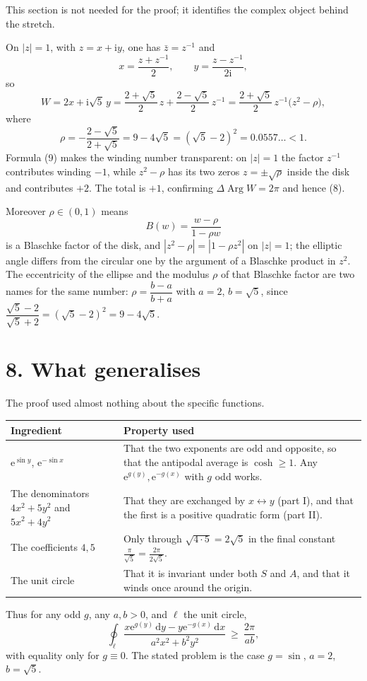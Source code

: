 \documentclass[12pt]{article}
\newcommand{\dd}{\,\mathrm{d}}
\newcommand{\ii}{\mathrm{i}}
\newcommand{\e}{\mathrm{e}}
\newcommand{\Arg}{\operatorname{Arg}}
\newcommand{\lc}{\ell}
\begin{document}
This section is not needed for the proof; it identifies the complex
object behind the stretch.

On \(|z|=1\), with \(z=x+\ii y\), one has \(\bar z=z^{-1}\) and
\[
x=\frac{z+z^{-1}}{2},\qquad y=\frac{z-z^{-1}}{2\ii},
\]
so
\[
W=2x+\ii\sqrt5\,y=\frac{2+\sqrt5}{2}\,z+\frac{2-\sqrt5}{2}\,z^{-1}
=\frac{2+\sqrt5}{2}\,z^{-1}\bigl(z^2-\rho\bigr),
\tag{9}
\]
where
\[
\rho=-\frac{2-\sqrt5}{2+\sqrt5}=9-4\sqrt5=(\sqrt5-2)^2=0.0557\ldots<1 .
\]
Formula (9) makes the winding number transparent: on \(|z|=1\) the factor
\(z^{-1}\) contributes winding \(-1\), while \(z^2-\rho\) has its two
zeros \(z=\pm\sqrt\rho\) inside the disk and contributes \(+2\). The
total is \(+1\), confirming \(\Delta\Arg W=2\pi\) and hence (8).

Moreover \(\rho\in(0,1)\) means
\[
B(w)=\frac{w-\rho}{1-\rho w}
\]
is a Blaschke factor of the disk, and \(|z^2-\rho|=|1-\rho z^2|\) on
\(|z|=1\); the elliptic angle differs from the circular one by the
argument of a Blaschke product in \(z^2\). The eccentricity of the
ellipse and the modulus \(\rho\) of that Blaschke factor are two names
for the same number: \(\rho=\dfrac{b-a}{b+a}\) with \(a=2\),
\(b=\sqrt5\), since
\(\dfrac{\sqrt5-2}{\sqrt5+2}=(\sqrt5-2)^2=9-4\sqrt5\).

\section*{8. What generalises}

The proof used almost nothing about the specific functions.

\begin{center}
\small
\renewcommand{\arraystretch}{1.45}
\begin{tabularx}{\textwidth}{@{}>{\raggedright\arraybackslash}p{}X@{}}
\toprule
Ingredient & Property used \\
\midrule
\(\e^{\sin y}\), \(\e^{-\sin x}\)
& That the two exponents are odd and opposite, so that the antipodal
average is \(\cosh\ge1\). Any \(\e^{g(y)},\e^{-g(x)}\) with \(g\) odd
works. \\
\addlinespace
The denominators \(4x^2+5y^2\) and \(5x^2+4y^2\)
& That they are exchanged by \(x\leftrightarrow y\) (part I), and that
the first is a positive quadratic form (part II). \\
\addlinespace
The coefficients \(4,5\)
& Only through \(\sqrt{4\cdot5}=2\sqrt5\) in the final constant
\(\frac{\pi}{\sqrt5}=\frac{2\pi}{2\sqrt5}\). \\
\addlinespace
The unit circle
& That it is invariant under both \(S\) and \(A\), and that it winds once
around the origin. \\
\bottomrule
\end{tabularx}
\end{center}

Thus for any odd \(g\), any \(a,b>0\), and \(\lc\) the unit circle,
\[
\oint_{\lc}\frac{x\e^{g(y)}\dd y-y\e^{-g(x)}\dd x}{a^2x^2+b^2y^2}
\ \ge\ \frac{2\pi}{ab},
\]
with equality only for \(g\equiv0\). The stated problem is the case
\(g=\sin\), \(a=2\), \(b=\sqrt5\).
\end{document}
